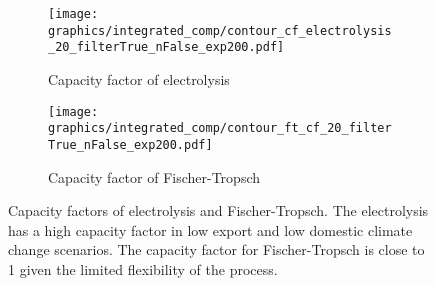 \begin{figure*}[h] %
    \centering
    \begin{subfigure}[b]{0.49\linewidth}
        \centering
        \texttt{[image: graphics/integrated\_comp/contour\_cf\_electrolysis\_20\_filterTrue\_nFalse\_exp200.pdf]}
        \caption{Capacity factor of electrolysis}
        \label{fig:cf-ely}
    \end{subfigure}
    \hfill
    \begin{subfigure}[b]{0.49\linewidth}
        \centering
        \texttt{[image: graphics/integrated\_comp/contour\_ft\_cf\_20\_filterTrue\_nFalse\_exp200.pdf]}
        \caption{Capacity factor of Fischer-Tropsch}
        \label{fig:cf-ft}
    \end{subfigure}
    \hfill
    \caption{Capacity factors of electrolysis and Fischer-Tropsch. The electrolysis has a high capacity factor in low export and low domestic climate change scenarios. The capacity factor for Fischer-Tropsch is close to 1 given the limited flexibility of the process.}
    \label{fig:cf-ely-ft}
\end{figure*}



\clearpage
